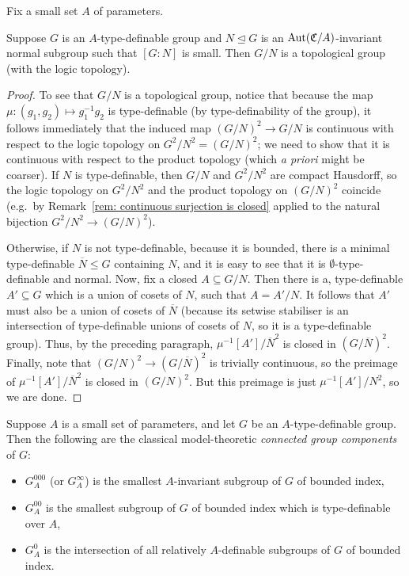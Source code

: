 	\begin{fct}
		\label{fct:quotient_by_bounded_subgroup}
		Fix a small set $A$ of parameters.
		
		Suppose $G$ is an $A$-type-definable group and $N\unlhd G$ is an $\operatorname{{Aut}}({\mathfrak C}/A)$-invariant normal subgroup such that $[G:N]$ is small. Then $G/N$ is a topological group (with the logic topology).
	\end{fct}
	\begin{proof}
		To see that $G/N$ is a topological group, notice that because the map $\mu\colon (g_1,g_2)\mapsto g_1^{-1}g_2$ is type-definable (by type-definability of the group), it follows immediately that the induced map $(G/N)^2\to G/N$ is continuous with respect to the logic topology on $G^2/N^2=(G/N)^2$; we need to show that it is continuous with respect to the product topology (which \emph{a priori} might be coarser). If $N$ is type-definable, then $G/N$ and $G^2/N^2$ are compact Hausdorff, so the logic topology on $G^2/N^2$ and the product topology on $(G/N)^2$ coincide (e.g.\ by Remark~\ref{rem: continuous surjection is closed} applied to the natural bijection $G^2/N^2\to (G/N)^2$).
		
		Otherwise, if $N$ is not type-definable, because it is bounded, there is a minimal type-definable $\overline N\leq G$ containing $N$, and it is easy to see that it is $\emptyset$-type-definable and normal. Now, fix a closed $A\subseteq G/N$. Then there is a, type-definable $A'\subseteq G$ which is a union of cosets of $N$, such that $A=A'/N$. It follows that $A'$ must also be a union of cosets of $\overline N$ (because its setwise stabiliser is an intersection of type-definable unions of cosets of $N$, so it is a type-definable group). Thus, by the preceding paragraph, $\mu^{-1}[A']/{\overline N}^2$ is closed in $(G/{\overline N})^2$. Finally, note that $(G/N)^2\to (G/{\overline N})^2$ is trivially continuous, so the preimage of $\mu^{-1}[A']/{\overline N}^2$ is closed in $(G/N)^2$. But this preimage is just $\mu^{-1}[A']/N^2$, so we  are done.
	\end{proof}
	
	
	\begin{dfn}
		Suppose $A$ is a small set of parameters, and let $G$ be an $A$-type-definable group. Then the following are the classical model-theoretic \emph{connected group components} of $G$:
		\begin{itemize}
			\item
			$G^{000}_A$ (or $G^{\infty}_A$) is the smallest $A$-invariant subgroup of $G$ of bounded index,
			\item
			$G^{00}_A$ is the smallest subgroup of $G$ of bounded index which is type-definable over $A$,
			\item
			$G^{0}_A$ is the intersection of all relatively $A$-definable subgroups of $G$ of bounded index.
		\end{itemize}
	\end{dfn}
	
